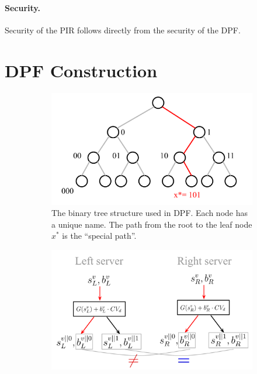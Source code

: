 \paragraph{Security.}
Security of the PIR follows directly from the security of the DPF.



\section{DPF Construction}

\begin{figure}[t]
    \centering

    \begin{subfigure}{0.48\textwidth}
     \includegraphics[width=\textwidth]{DPFtree.pdf}
     \caption{The binary tree structure used in DPF. Each node has a unique name. The path from the root to the leaf node $x^*$ is the ``special path''.}
\label{fig:tree}
    \end{subfigure}   
    \hfill
     \begin{subfigure}{0.48\textwidth}
        \includegraphics[width=\textwidth]{DPF1.pdf}

\end{subfigure}
\end{figure}
